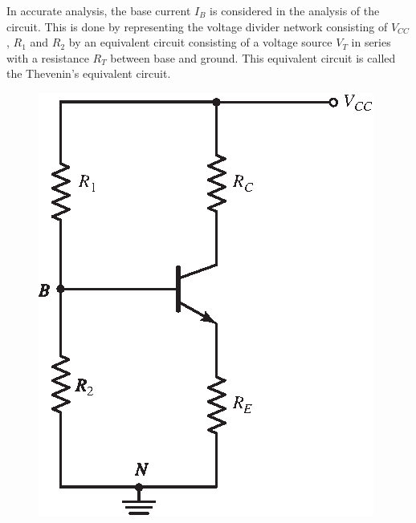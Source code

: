In accurate analysis, the base current $I_{B}$ is considered in the analysis of the circuit. This is done by representing the voltage divider network consisting of $V_{CC}$, $R_{1}$ and $R_{2}$ by an equivalent circuit consisting of a voltage source $V_{T}$ in series with a resistance $R_{T}$ between base and ground. This equivalent circuit is called the Thevenin's equivalent circuit.
\begin{center}
\begin{minipage}[b]{6cm}
\begin{figure}[H]
\centering
\includegraphics{chap3/S3-EE-03-046.eps}


\end{figure}
\end{minipage}
\end{center}
